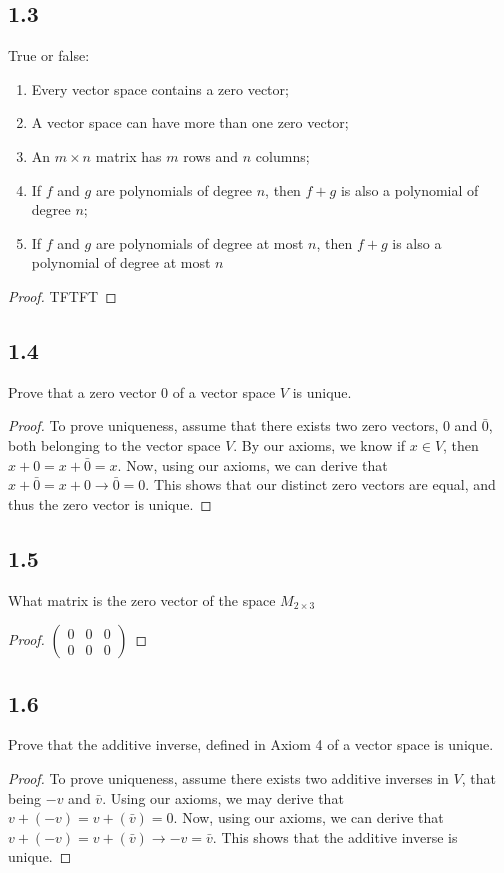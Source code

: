 \documentclass{amsart}
\begin{document}
\subsection*{1.3} True or false:
\begin{enumerate}[label=\alph*)]
    \item Every vector space contains a zero vector;
    \item A vector space can have more than one zero vector;
    \item An $m \times n$ matrix has $m$ rows and $n$ columns; 
    \item If $f$ and $g$ are polynomials of degree $n$, then $f+g$ is also a polynomial of degree $n$;
    \item If $f$ and $g$ are polynomials of degree at most $n$, then $f+g$ is also a polynomial of degree at most $n$
\end{enumerate}
\begin{proof}
    TFTFT
\end{proof}
\subsection*{1.4} Prove that a zero vector 0 of a vector space $V$ is unique. 
\begin{proof}
    To prove uniqueness, assume that there exists two zero vectors, $0$ and $\bar{0}$, both belonging to the vector space $V$. By our axioms, we know if $x \in V$, then $x + 0 = x + \bar{0} = x$. Now, using our axioms, we can derive that $x + \bar{0} = x + 0 \rightarrow \bar{0} = 0$. This shows that our distinct zero vectors are equal, and thus the zero vector is unique. 
\end{proof}
\subsection*{1.5} What matrix is the zero vector of the space $M_{2\times 3}$
\begin{proof}
   $ \begin{pmatrix}
        0 & 0 & 0 \\ 
        0 & 0 & 0
    \end{pmatrix}$
\end{proof}
\subsection*{1.6} Prove that the additive inverse, defined in Axiom 4 of a vector space is unique. 
\begin{proof}
    To prove uniqueness, assume there exists two additive inverses in $V$, that being $-v$ and $\bar{v}$. Using our axioms, we may derive that $v + (-v) = v + (\bar{v})= 0$. Now, using our axioms, we can derive that $v + (-v) = v + (\bar{v}) \rightarrow -v = \bar{v}$. This shows that the additive inverse is unique.  
\end{proof}
\end{document}
